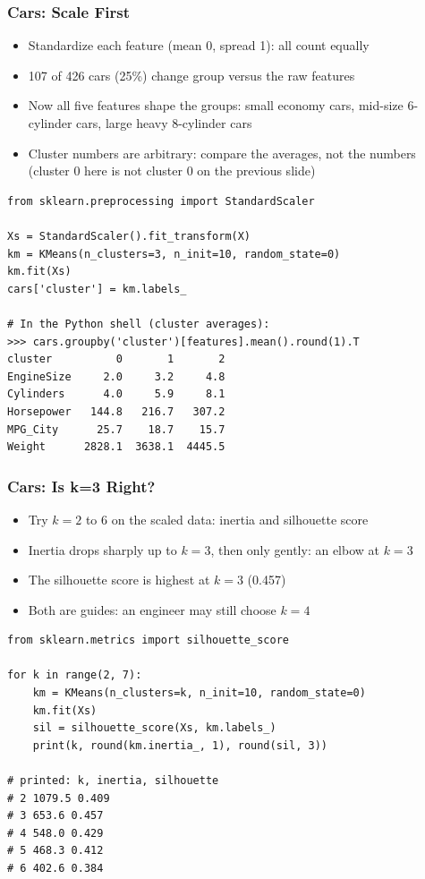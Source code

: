 \begin{frame}[fragile]\frametitle{Cars: Scale First}
\begin{itemize}
\item Standardize each feature (mean 0, spread 1): all count equally
\item 107 of 426 cars (25\%) change group versus the raw features
\item Now all five features shape the groups: small economy cars, mid-size 6-cylinder cars, large heavy 8-cylinder cars
\item Cluster numbers are arbitrary: compare the averages, not the numbers (cluster 0 here is not cluster 0 on the previous slide)
\end{itemize}
\begin{lstlisting}
from sklearn.preprocessing import StandardScaler

Xs = StandardScaler().fit_transform(X)
km = KMeans(n_clusters=3, n_init=10, random_state=0)
km.fit(Xs)
cars['cluster'] = km.labels_

# In the Python shell (cluster averages):
>>> cars.groupby('cluster')[features].mean().round(1).T
cluster          0       1       2
EngineSize     2.0     3.2     4.8
Cylinders      4.0     5.9     8.1
Horsepower   144.8   216.7   307.2
MPG_City      25.7    18.7    15.7
Weight      2828.1  3638.1  4445.5
\end{lstlisting}
\end{frame}

\begin{frame}[fragile]\frametitle{Cars: Is k=3 Right?}
\begin{itemize}
\item Try $k=2$ to $6$ on the scaled data: inertia and silhouette score
\item Inertia drops sharply up to $k=3$, then only gently: an elbow at $k=3$
\item The silhouette score is highest at $k=3$ (0.457)
\item Both are guides: an engineer may still choose $k=4$
\end{itemize}
\begin{lstlisting}
from sklearn.metrics import silhouette_score

for k in range(2, 7):
    km = KMeans(n_clusters=k, n_init=10, random_state=0)
    km.fit(Xs)
    sil = silhouette_score(Xs, km.labels_)
    print(k, round(km.inertia_, 1), round(sil, 3))

# printed: k, inertia, silhouette
# 2 1079.5 0.409
# 3 653.6 0.457
# 4 548.0 0.429
# 5 468.3 0.412
# 6 402.6 0.384
\end{lstlisting}
\end{frame}

